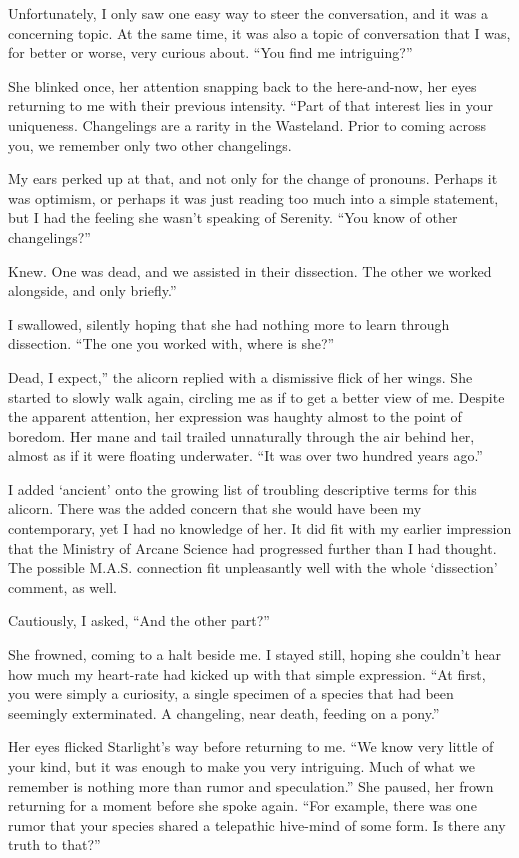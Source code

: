 Unfortunately, I only saw one easy way to steer the conversation, and it was a concerning topic. At the same time, it was also a topic of conversation that I was, for better or worse, very curious about. “You find me intriguing?”

She blinked once, her attention snapping back to the here-and-now, her eyes returning to me with their previous intensity. “Part of that interest lies in your uniqueness. Changelings are a rarity in the Wasteland. Prior to coming across you, we remember only two other changelings.

My ears perked up at that, and not only for the change of pronouns. Perhaps it was optimism, or perhaps it was just reading too much into a simple statement, but I had the feeling she wasn’t speaking of Serenity. “You know of other changelings?”

\leavevmode{}Knew. One was dead, and we assisted in their dissection. The other we worked alongside, and only briefly.”

I swallowed, silently hoping that she had nothing more to learn through dissection. “The one you worked with, where is she?”

\leavevmode{}Dead, I expect,” the alicorn replied with a dismissive flick of her wings. She started to slowly walk again, circling me as if to get a better view of me. Despite the apparent attention, her expression was haughty almost to the point of boredom. Her mane and tail trailed unnaturally through the air behind her, almost as if it were floating underwater. “It was over two hundred years ago.”

I added ‘ancient’ onto the growing list of troubling descriptive terms for this alicorn. There was the added concern that she would have been my contemporary, yet I had no knowledge of her. It did fit with my earlier impression that the Ministry of Arcane Science had progressed further than I had thought. The possible M.A.S. connection fit unpleasantly well with the whole ‘dissection’ comment, as well.

Cautiously, I asked, “And the other part?”

She frowned, coming to a halt beside me. I stayed still, hoping she couldn’t hear how much my heart-rate had kicked up with that simple expression. “At first, you were simply a curiosity, a single specimen of a species that had been seemingly exterminated. A changeling, near death, feeding on a pony.”

Her eyes flicked Starlight’s way before returning to me. “We know very little of your kind, but it was enough to make you very intriguing. Much of what we remember is nothing more than rumor and speculation.” She paused, her frown returning for a moment before she spoke again. “For example, there was one rumor that your species shared a telepathic hive-mind of some form. Is there any truth to that?”

